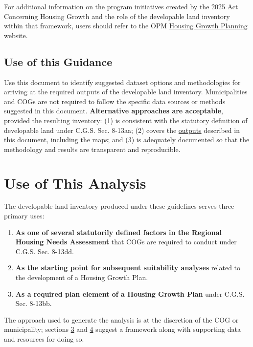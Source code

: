 \documentclass[
  letterpaper,
  DIV=11,
  numbers=noendperiod]{scrreprt}
\begin{document}
For additional information on the program initiatives created by the
2025 Act Concerning Housing Growth and the role of the developable land
inventory within that framework, users should refer to the OPM
\href{https://experience.arcgis.com/experience/057c27cda2d848edbcb1ffac4a1b8898}{Housing
Growth Planning} website.

\section{Use of this Guidance}\label{use-of-this-guidance}

Use this document to identify suggested dataset options and
methodologies for arriving at the required outputs of the developable
land inventory. Municipalities and COGs are not required to follow the
specific data sources or methods suggested in this document.
\textbf{Alternative approaches are acceptable}, provided the resulting
inventory: (1) is consistent with the statutory definition of
developable land under C.G.S. Sec. 8-13aa; (2) covers the
\href{outputs.qmd}{outputs} described in this document, including the
maps; and (3) is adequately documented so that the methodology and
results are transparent and reproducible.


\chapter{Use of This Analysis}\label{use-of-this-analysis-1}

The developable land inventory produced under these guidelines serves
three primary uses:

\begin{enumerate}
\def\labelenumi{\arabic{enumi}.}
\item
  \textbf{As one of several statutorily defined factors in the Regional
  Housing Needs Assessment} that COGs are required to conduct under
  C.G.S. Sec. 8-13dd.
\item
  \textbf{As the starting point for subsequent suitability analyses}
  related to the development of a Housing Growth Plan.
\item
  \textbf{As a required plan element of a Housing Growth Plan} under
  C.G.S. Sec. 8-13bb.
\end{enumerate}

The approach used to generate the analysis is at the discretion of the
COG or municipality; sections \ul{3} and \ul{4} suggest a framework
along with supporting data and resources for doing so.
\end{document}
